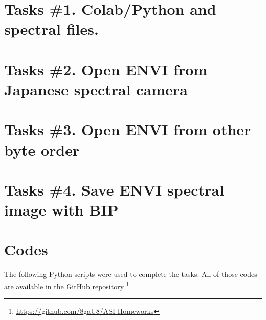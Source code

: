 \section{Tasks \#1. Colab/Python and spectral files.}


\section{Tasks \#2. Open ENVI from Japanese spectral camera}


\section{Tasks \#3. Open ENVI from other byte order}


\section{Tasks \#4. Save ENVI spectral image with BIP}


\section{Codes}

The following Python scripts were used to complete the tasks. All of those codes are available in the GitHub repository \footnote{\url{https://github.com/8gaU8/ASI-Homeworks}}.






